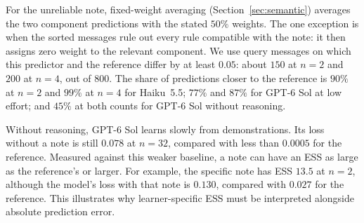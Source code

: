 For the unreliable note, fixed-weight averaging (Section~\ref{sec:semantic}) averages the two component predictions with the stated $50\%$ weights. The one exception is when the sorted messages rule out every rule compatible with the note: it then assigns zero weight to the relevant component. We use query messages on which this predictor and the reference differ by at least $0.05$: about $150$ at $n=2$ and $200$ at $n=4$, out of $800$. The share of predictions closer to the reference is $90\%$ at $n=2$ and $99\%$ at $n=4$ for Haiku~5.5; $77\%$ and $87\%$ for GPT-6 Sol at low effort; and $45\%$ at both counts for GPT-6 Sol without reasoning.

Without reasoning, GPT-6 Sol learns slowly from demonstrations. Its loss without a note is still $0.078$ at $n=32$, compared with less than $0.0005$ for the reference. Measured against this weaker baseline, a note can have an ESS as large as the reference's or larger. For example, the specific note has ESS $13.5$ at $n=2$, although the model's loss with that note is $0.130$, compared with $0.027$ for the reference. This illustrates why learner-specific ESS must be interpreted alongside absolute prediction error.

